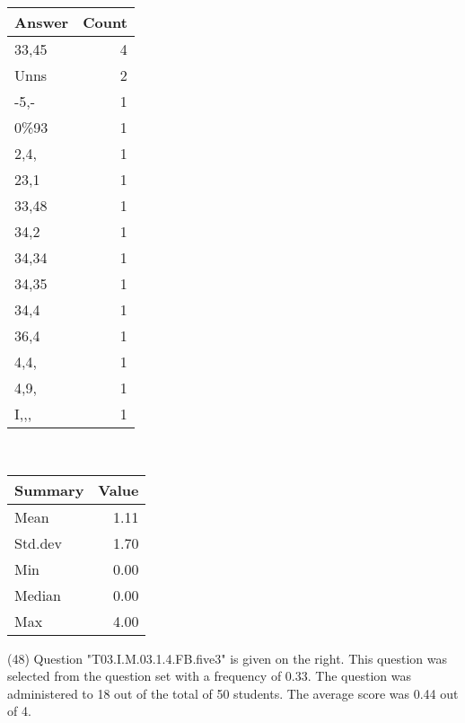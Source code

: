 \documentclass[12pt,english,nohyper]{tufte-handout}\usepackage[]{graphicx}\usepackage[]{color}
\begin{document}
\begin{center}%
\begin{tabular}{lr}
  \hline
Answer & Count \\ 
  \hline
33,45 &   4 \\ 
  Unns &   2 \\ 
  -5,- &   1 \\ 
  0\%93 &   1 \\ 
  2,4, &   1 \\ 
  23,1 &   1 \\ 
  33,48 &   1 \\ 
  34,2 &   1 \\ 
  34,34 &   1 \\ 
  34,35 &   1 \\ 
  34,4 &   1 \\ 
  36,4 &   1 \\ 
  4,4, &   1 \\ 
  4,9, &   1 \\ 
  I,,, &   1 \\ 
   \hline
\end{tabular}
~~~~~~~~%
\begin{tabular}{lr}
  \hline
Summary & Value \\ 
  \hline
Mean & 1.11 \\ 
  Std.dev & 1.70 \\ 
  Min & 0.00 \\ 
  Median & 0.00 \\ 
  Max & 4.00 \\ 
   \hline
\end{tabular}
\end{center}\newpage{} (48) Question "T03.I.M.03.1.4.FB.five3" is given on the right. This question was selected from the question set with a frequency of 0.33. The question was administered to 18 out of the total of 50 students. The average score was 0.44 out of 4.
\end{document}
